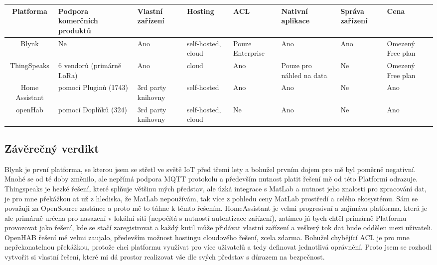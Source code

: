 \begin{center} %
    \begin{tabular}{ |c| m{5em}| m{5em}|m{5em}|m{4em}| m{5em}| m{4em}| m{4em}| }
        \hline
        Platforma      & Podpora komerčních produktů & Vlastní zařízení   & Hosting            & ACL              & Nativní aplikace         & Správa zařízení & Cena              \\
        \hline
        Blynk          & Ne                          & Ano                & self-hosted, cloud & Pouze Enterprise & Ano                      & Ano             & Omezený Free plan \\
        \hline
        ThingSpeaks    & 6 vendorů (primárně LoRa)   & Ano                & cloud              & Ano              & Pouze pro náhled na data & Ne              & Omezený Free plan \\
        \hline
        Home Assistant & pomocí Pluginů (1743)       & 3rd party knihovny & self-hosted        & Ano              & Ano                      & Ne              & Ano               \\
        \hline
        openHab        & pomocí Doplňků (324)        & 3rd party knihovny & self-hosted, cloud & Ne               & Ano                      & Ne              & Ano               \\
        \hline
    \end{tabular}
\end{center}

\subsection{Závěrečný verdikt}
Blynk je první platforma, se kterou jsem se střetl ve světě IoT před třemi lety a bohužel prvním dojem pro mě byl poměrně negativní. Mnohé se od té doby změnilo, ale nepřímá podpora MQTT protokolu a především nutnost platit řešení mě od této Platformi odrazuje. Thingspeaks je hezké řešení, které splňuje většinu mých představ, ale úzká integrace s MatLab a nutnost jeho znalosti pro zpracování dat, je pro mne překážkou ať už z hlediska, že MatLab nepoužívám, tak více z pohledu ceny MatLab prostředí a celého ekosystému. Sám se považuji za OpenSource zastánce a proto mě to táhne k těmto řešením. HomeAssistant je velmi progresivní a zajímáva platforma, která je ale primárně určena pro nasazení v lokální síti (nepočítá s nutností autentizace zařízení), zatímco já bych chtěl primárně Platformu provozovat jako řešení, kde se stačí zaregistrovat a každý kutil může přidávat vlastní zařízení a veškerý tok dat bude oddělen mezi uživateli. OpenHAB řešení mě velmi zaujalo, především možnost hostingu cloudového řešení, zcela zdarma. Bohužel chybějící ACL je pro mne nepřekonatelnou překážkou, protože chci platformu využívat pro více uživatelů a tedy definovat jednotlivá oprávnění. Proto jsem se rozhodl vytvořit si vlastní řešení, které mi dá prostor realizovat vše dle svých představ s důrazem na bezpečnost.

